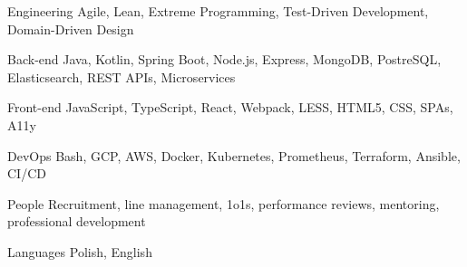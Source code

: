 

\begin{cvskills}

  \cvskill
  {Engineering} %
  {Agile, Lean, Extreme Programming, Test-Driven Development, Domain-Driven Design} %

  \cvskill
    {Back-end} %
    {Java, Kotlin, Spring Boot, Node.js, Express, MongoDB, PostreSQL, Elasticsearch, REST APIs, Microservices} %

  \cvskill
    {Front-end} %
    {JavaScript, TypeScript, React, Webpack, LESS, HTML5, CSS, SPAs, A11y} %

  \cvskill
  {DevOps} %
  {Bash, GCP, AWS, Docker, Kubernetes, Prometheus, Terraform, Ansible, CI/CD} %

  \cvskill
    {People} %
    {Recruitment, line management, 1o1s, performance reviews, mentoring, professional development} %

  \cvskill
    {Languages} %
    {Polish, English} %

\end{cvskills}
